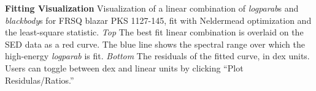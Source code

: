 \textbf{\label{fig:fitting} Fitting Visualization} Visualization of a linear combination of {\it{logparab}}s and {\it{blackbody}}s for FRSQ blazar PKS 1127-145, fit with Neldermead optimization and the least-square statistic. {\it{Top}} The best fit linear combination is overlaid on the SED data as a red curve. The blue line shows the spectral range over which the high-energy {\it{logparab}} is fit. {\it{Bottom}} The residuals of the fitted curve, in dex units. Users can toggle between dex and linear units by clicking ``Plot Residulas/Ratios.''
